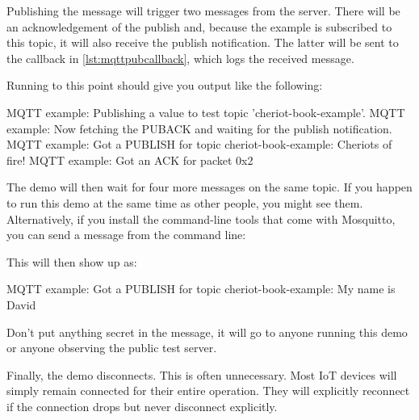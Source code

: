 \codelisting[filename=examples/mqtt/mqtt.cc,marker=publish,label=lst:mqttpublish,caption="Publishing to an MQTT topic."]{}

Publishing the message will trigger two messages from the server.
There will be an acknowledgement of the publish and, because the example is subscribed to this topic, it will also receive the publish notification.
The latter will be sent to the callback in \ref{lst:mqttpubcallback}, which logs the received message.

\codelisting[filename=examples/mqtt/mqtt.cc,marker=publish_callback,label=lst:mqttpubcallback,caption="Callback for receiving published MQTT messages."]{}

Running to this point should give you output like the following:

\begin{console}
MQTT example: Publishing a value to test topic 'cheriot-book-example'.
MQTT example: Now fetching the PUBACK and waiting for the publish notification.
MQTT example: Got a PUBLISH for topic cheriot-book-example: Cheriots of fire!
MQTT example: Got an ACK for packet 0x2
\end{console}

The demo will then wait for four more messages on the same topic.
If you happen to run this demo at the same time as other people, you might see them.
Alternatively, if you install the command-line tools that come with Mosquitto, you can send a message from the command line:


This will then show up as:

\begin{console}
MQTT example: Got a PUBLISH for topic cheriot-book-example: My name is David
\end{console}

Don't put anything secret in the message, it will go to anyone running this demo or anyone observing the public test server.

Finally, the demo disconnects.
This is often unnecessary.
Most IoT devices will simply remain connected for their entire operation.
They will explicitly reconnect if the connection drops but never disconnect explicitly.

\codelisting[filename=examples/mqtt/mqtt.cc,marker=disconnect,label=lst:mqttdisconnect,caption="Gracefully disconnecting from an MQTT server."]{}

